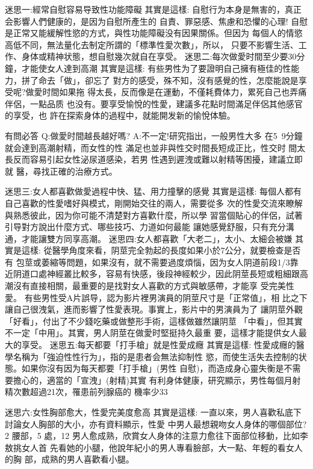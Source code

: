 \documentclass[12pt,UTF8]{ctexbook}
\begin{document}
迷思一:經常自慰容易导致性功能障礙
其實是這樣:
自慰行为本身是無害的，真正会影響人們健康的，是因为自慰所產生的
自責、罪惡感、焦慮和恐懼的心理!
自慰是正常又能緩解性慾的方式，與性功能障礙没有因果關係。但因为
每個人的情慾高低不同，無法量化去制定所謂的「標準性愛次數」，所以，
只要不影響生活、工作、身体或精神状態，想自慰幾次就自在享受。
迷思二:每次做愛时間至少要30分鐘，才能使女人達到高潮
其實是這樣:
有些男性为了要證明自己擁有極佳的性能力，拼了命去「做」，卻忘了
對方的感受，殊不知，沒有感覺的性，怎麼能說是享受呢?做愛时間如果拖
得太長，反而像是在運動，不僅耗費体力，累死自己也弄痛伴侶，一點品质
也没有。要享受愉悅的性愛，建議多花點时間滿足伴侶其他感官的享受，也
許在探索身体的過程中，就能開发新的愉悅体驗。

有問必答
Q:做愛时間越長越好嗎?
A:不一定!研究指出，一般男性大多
在5~9分鐘就会達到高潮射精，而女性的性
滿足也並非與性交时間長短成正比，性交时
間太長反而容易引起女性泌尿道感染，若男
性遇到遲洩或難以射精等困擾，建議立即就
醫，尋找正確的治療方式。

迷思三:女人都喜歡做愛過程中快、猛、用力撞擊的感覺
其實是這樣:
每個人都有自己喜歡的性愛嗜好與模式，剛開始交往的兩人，需要從多
次的性愛交流來瞭解與熟悉彼此，因为你可能不清楚對方喜歡什麼，所以學
習當個貼心的伴侶，試著引导對方說出什麼方式、哪些技巧、力道如何最能
讓她感覺舒服，只有充分溝通，才能讓雙方同享高潮。
迷思四:女人都喜歡「大老二」，太小、太細会被嫌
其實是這樣:
從醫學角度來看，阴莖完全勃起的長度如果小於7公分，就要檢查是否有
包莖或萎縮等問題，如果沒有，就不需要過度煩惱，因为女人阴道前段1/3靠
近阴道口處神經叢比較多，容易有快感，後段神經較少，因此阴莖長短或粗細跟高潮沒有直接相關，最重要的是找對女人喜歡的方式與敏感帶，才能享
受完美性愛。
有些男性受A片誤导，認为影片裡男演員的阴莖尺寸是「正常值」，相
比之下讓自己很洩氣，進而影響了性愛表現。事實上，影片中的男演員为了
讓阴莖外觀「好看」，付出了不少錢吃藥或做整形手術，這樣做雖然讓阴莖
「中看」，但其實不一定「中用」。其實，男人阴莖在做愛时堅挺持久最重
要，這樣才能提供女人最大的享受。
迷思五:每天都要「打手槍」就是性愛成癮
其實是這樣:
性愛成癮的醫學名稱为「強迫性性行为」，指的是患者会無法抑制性
慾，而使生活失去控制的状態。如果你沒有因为每天都要「打手槍」(男性
自慰)，而造成身心靈失衡是不需要擔心的，適當的「宣洩」(射精)其實
有利身体健康，研究顯示，男性每個月射精次數超過21次，罹患前列腺癌的
機率少33%

迷思六:女性胸部愈大，性愛完美度愈高
其實是這樣:
一直以來，男人喜歡私底下討論女人胸部的大小，亦有資料顯示，性愛
中男人最想親吻女人身体的哪個部位?2%
腰部，5%
處，12%
男人愈成熟，欣賞女人身体的注意力愈往下面部位移動，比如李敖挑女人首
先看她的小腿，他說年紀小的男人專看臉部，大一點、年輕的看女人的胸
部，成熟的男人喜歡看小腿。
\end{document}
